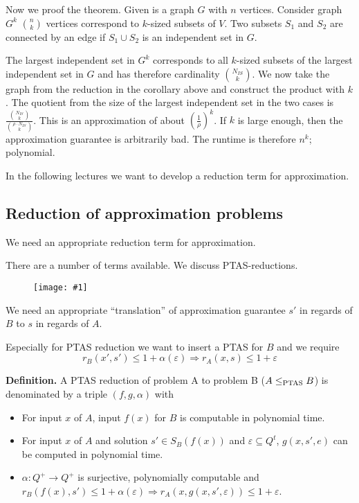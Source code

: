 \documentclass[a4paper]{article}
\newcommand{\drawing}[1]{%
 \begin{figure}[ht]
  \begin{center}
   \texttt{[image: \#1]}
  \end{center}
 \end{figure}
}
\newcommand{\cls}[1]{\rm{#1}}
\begin{document}
Now we proof the theorem.
Given is a graph $G$ with $n$ vertices.
Consider graph $G^k$ ${n \choose k}$ vertices correspond to $k$-sized
subsets of $V$. Two subsets $S_1$ and $S_2$ are connected by an
edge if $S_1 \cup S_2$ is an independent set in $G$.

The largest independent set in $G^k$ corresponds to all $k$-sized
subsets of the largest independent set in $G$ and has therefore
cardinality ${N_{IS} \choose k}$.
We now take the graph from the reduction in the corollary above and
construct the product with $k$.
The quotient from the size of the largest independent set in the two
cases is $\frac{{N_{IS} \choose k}}{{\rho \cdot N_{IS} \choose k}}$.
This is an approximation of about $\left(\frac{1}{\rho}\right)^k$.
If $k$ is large enough, then the approximation guarantee is arbitrarily
bad.
The runtime is therefore $n^k$; polynomial.

In the following lectures we want to develop a reduction term for approximation.

\subsection{Reduction of approximation problems}
%
We need an appropriate reduction term for approximation.

There are a number of terms available. We discuss PTAS-reductions.

\drawing{approximation_reduction.pdf}

We need an appropriate ``translation'' of approximation guarantee $s'$
in regards of $B$ to $s$ in regards of $A$.

Especially for PTAS reduction we want to insert a PTAS for $B$ and
we require
\[
  r_B(x', s') \leq 1 + \alpha(\varepsilon)
    \Rightarrow r_A(x, s) \leq 1 + \varepsilon
\]

\textbf{Definition.}
  A PTAS reduction of problem A to problem B ($A \leq_{\cls{PTAS}} B$)
  is denominated by a triple $(f, g, \alpha)$ with
\begin{itemize}
  \item For input $x$ of $A$, input $f(x)$ for $B$ is computable in polynomial time.
  \item
    For input $x$ of $A$ and solution $s' \in S_B(f(x))$ and
    $\varepsilon \subseteq Q^t$, $g(x, s', e)$ can be computed in polynomial
    time.
  \item
    $\alpha: Q^+ \rightarrow Q^+$ is surjective, polynomially computable
    and $r_B(f(x), s') \leq 1 + \alpha(\varepsilon) \Rightarrow
    r_A(x, g(x, s', \varepsilon)) \leq 1 + \varepsilon$.
\end{itemize}
\end{document}
